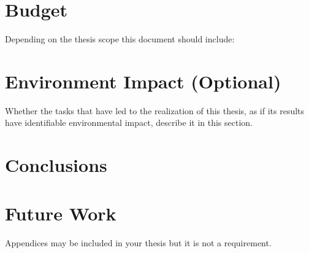 \documentclass[a4paper]{article}
\begin{document}
\clearpage
\section{Budget}
{
\foreignlanguage{english}{Depending on the thesis scope this document should include:}}

\clearpage
\section[Environment Impact (Optional)]{{Environment Impact (Optional)}}

{Whether the tasks that have led to the realization of this thesis, as if its results have identifiable environmental
impact, describe it in this section.}

\clearpage
\section{Conclusions}
\label{sec:conclusions}

\lipsum[4]

\lipsum[3]

\section{Future Work}
\label{sec:futwork}

\lipsum[10]

\newpage

\medskip

%
%

\clearpage
\newpage
\begin{appendices}

{Appendices may be included in your thesis but it is not a requirement.}

\end{appendices}
\end{document}
